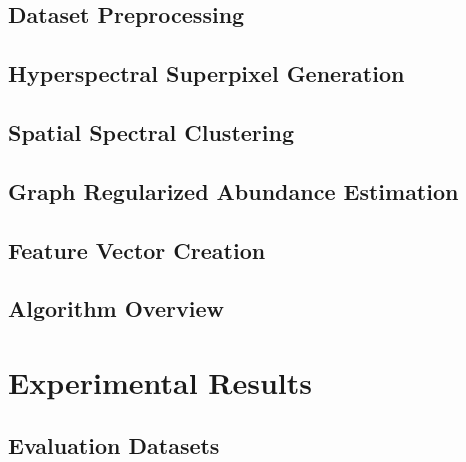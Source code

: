 \documentclass[10pt]{article}
\begin{document}
\subsection{Dataset Preprocessing} \label{Algorithm Preprocessing}



% 
\subsection{Hyperspectral Superpixel Generation} \label{Algorithm Superpixels}



\subsection{Spatial Spectral Clustering}\label{Algorithm NCuts}


\subsection{Graph Regularized Abundance Estimation}\label{Algorithm Unmixing}

% 


\subsection{Feature Vector Creation}\label{Algorithm FV}

\subsection{Algorithm Overview}\label{Algorithm Overview}


\clearpage
% 
% 
% 
% 
% 
\section{Experimental Results}


\subsection{Evaluation Datasets}

\end{document}
